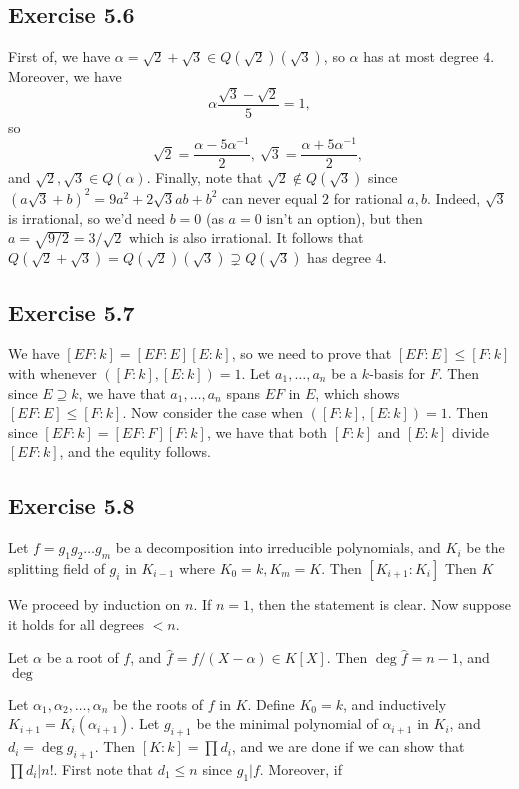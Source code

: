 \documentclass{article}
\theoremstyle{definition}
\begin{document}
\subsection*{Exercise 5.6} 
First of, we have $\alpha = \sqrt{2} + \sqrt{3} \in Q(\sqrt{2})(\sqrt{3})$, so
$\alpha$ has at most degree $4$. Moreover, we have 
\[
	\alpha \frac{\sqrt{3} - \sqrt{2}}{5} = 1,
\] 
so
\[
	\sqrt{2} = \frac{\alpha - 5\alpha^{-1}}{2},\ 
	\sqrt{3} = \frac{\alpha + 5\alpha^{-1}}{2},\ 
\] 
and $\sqrt{2}, \sqrt{3} \in Q(\alpha)$. Finally, note that $\sqrt{2} \not \in
Q(\sqrt{3})$ since $(a\sqrt{3} + b)^{2} = 9a^{2} + 2\sqrt{3}ab + b^{2}$ can
never equal $2$ for rational $a, b$. Indeed, $\sqrt{3}$ is irrational, so we'd
need $b = 0$ (as $a = 0$ isn't an option), but then $a = \sqrt{9/2} =
3/\sqrt{2}$ which is also irrational. It follows that $Q(\sqrt{2} + \sqrt{3}) =
Q(\sqrt{2})(\sqrt{3}) \supsetneq Q(\sqrt{3})$ has degree $4$.

\subsection*{Exercise 5.7}

We have $[EF:k] = [EF:E][E:k]$, so we need to prove that $[EF:E] \leq [F:k]$
with whenever $([F:k], [E:k]) = 1$. Let $a_1, \ldots, a_n$ be a $k$-basis for
$F$. Then since $E \supseteq k$, we have that $a_1, \ldots, a_n$ spans $EF$ in
$E$, which shows $[EF:E] \leq [F:k]$. Now consider the case when $([F:k],
[E:k]) = 1$. Then since $[EF:k] = [EF:F][F:k]$, we have that both $[F:k]$ and
$[E:k]$ divide $[EF:k]$, and the equlity follows.

\subsection*{Exercise 5.8}

Let $f = g_1 g_2 \ldots g_m$ be a decomposition into irreducible polynomials,
and $K_i$ be the splitting field of $g_i$ in $K_{i - 1}$ where $K_0 = k, K_m =
K$. Then $[K_{i + 1} : K_{i}]$
Then $K$

We proceed by induction on $n$. If $n = 1$, then the statement is clear. Now
suppose it holds for all degrees $< n$. 

Let $\alpha$ be a root of $f$, and 
$\hat{f} = f/(X - \alpha) \in K[X]$. Then $\deg \hat{f} = n - 1$, and 
$\deg$

Let $\alpha_1, \alpha_2, \ldots, \alpha_n$ be the roots of $f$ in $K$. Define
$K_0 = k$, and inductively $K_{i + 1} = K_{i}(\alpha_{i + 1})$. Let $g_{i + 1}$
be the minimal polynomial of $\alpha_{i + 1}$ in $K_i$, and $d_i = \deg g_{i +
1}$. Then $[K:k] = \prod d_i$, and we are done if we can show that $\prod d_i |
n!$. First note that $d_1 \leq n$ since $g_1 | f$. Moreover, if
\end{document}
